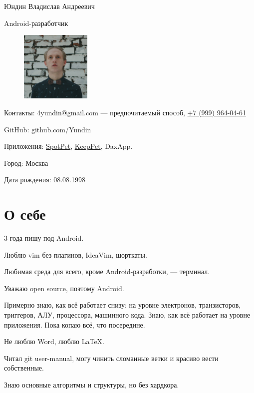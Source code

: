 \documentclass[a4paper,12pt]{article}
\begin{document}
    {\huge Юндин Владислав Андреевич}\par
    {\Large Android-разработчик}

    \setlength\intextsep{0pt}
    \begin{figure}
        \includegraphics[width=0.3\textwidth]{avatar_square}
    \end{figure}

    \bigskip
    Контакты: 4yundin@gmail.com --- предпочитаемый способ, \href{tel:+79999640461}{\color{black}+7 (999) 964-04-61}\par
    GitHub: github.com/Yundin
    
    Приложения: \href{https://play.google.com/store/apps/details?id=com.juntoteam.spotpet}{SpotPet}, \href{https://play.google.com/store/apps/details?id=com.juntoteam.keeppet}{KeepPet}, DaxApp.
    
    Город: Москва\par
    Дата рождения: 08.08.1998\par

    \vspace{7ex}
    \section*{О себе}

    3 года пишу под Android.

    Люблю vim без плагинов, IdeaVim, шорткаты. 

    Любимая среда для всего, кроме Android-разработки, --- терминал.

    Уважаю open source, поэтому Android.

    Примерно знаю, как всё работает снизу: на уровне электронов, транзисторов, триггеров, АЛУ, процессора, машинного кода. Знаю, как всё работает на уровне приложения. Пока копаю всё, что посередине.

    Не люблю Word, люблю \LaTeX.

    Читал git user-manual, могу чинить сломанные ветки и красиво вести собственные.

    Знаю основные алгоритмы и структуры, но без хардкора.
\end{document}

